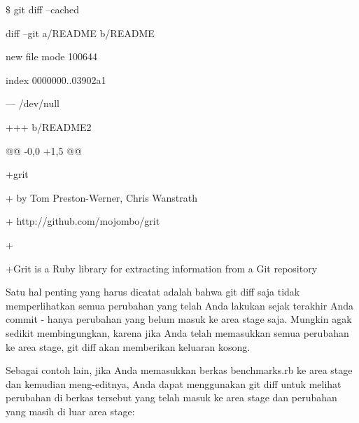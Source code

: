 \vspace{14pt}
\noindent 
{\fontsize{14pt}{14pt}\selectfont  $  \$  $ git diff --cached \\} \par
\noindent 
{\fontsize{14pt}{14pt}\selectfont diff --git a/README b/README \\} \par
\noindent 
{\fontsize{14pt}{14pt}\selectfont new file mode 100644 \\} \par
\noindent 
{\fontsize{14pt}{14pt}\selectfont index 0000000..03902a1 \\} \par
\noindent 
{\fontsize{14pt}{14pt}\selectfont --- /dev/null \\} \par
\noindent 
{\fontsize{14pt}{14pt}\selectfont +++ b/README2 \\} \par
\noindent 
{\fontsize{14pt}{14pt}\selectfont @@ -0,0 +1,5 @@ \\} \par
\noindent 
{\fontsize{14pt}{14pt}\selectfont +grit \\} \par
\noindent 
{\fontsize{14pt}{14pt}\selectfont + by Tom Preston-Werner, Chris Wanstrath \\} \par
\noindent 
{\fontsize{14pt}{14pt}\selectfont + http://github.com/mojombo/grit \\} \par
\noindent 
{\fontsize{14pt}{14pt}\selectfont + \\} \par
\noindent 
{\fontsize{14pt}{14pt}\selectfont +Grit is a Ruby library for extracting information from a Git repository \\} \par
\noindent 
{\fontsize{14pt}{14pt}\selectfont Satu hal penting yang harus dicatat adalah bahwa $  $git diff $  $saja tidak memperlihatkan semua perubahan yang telah Anda lakukan sejak terakhir Anda commit - hanya perubahan yang belum masuk ke area stage saja. Mungkin agak sedikit membingungkan, karena jika Anda telah memasukkan semua perubahan ke area stage, $  $git diff $  $akan memberikan keluaran kosong. \\} \par
\noindent 
{\fontsize{14pt}{14pt}\selectfont Sebagai contoh lain, jika Anda memasukkan berkas benchmarks.rb ke area stage dan kemudian meng-editnya, Anda dapat menggunakan $  $git diff $  $untuk melihat perubahan di berkas tersebut yang telah masuk ke area stage dan perubahan yang masih di luar area stage: \\} \par
